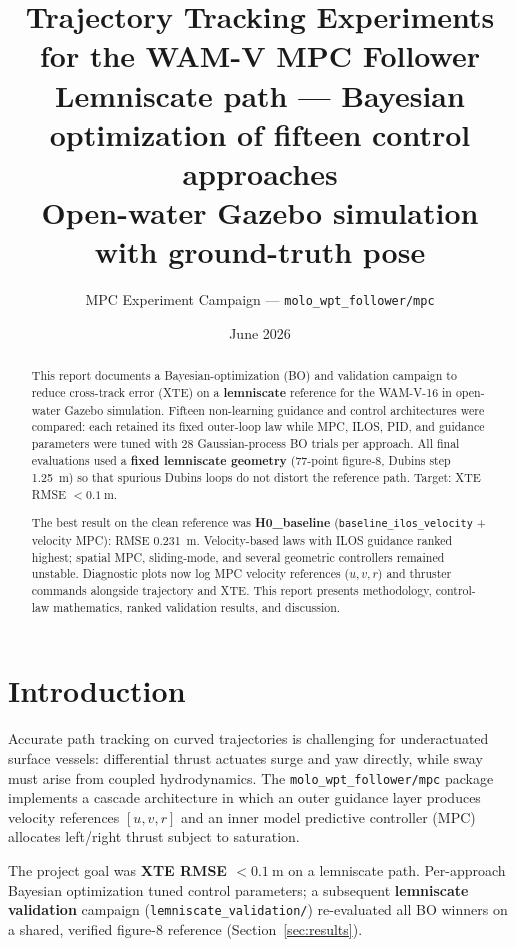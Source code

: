\documentclass[11pt,a4paper]{article}
\title{%
  \textbf{Trajectory Tracking Experiments for the WAM-V MPC Follower}\\[0.4em]
  \large Lemniscate path --- Bayesian optimization of fifteen control approaches\\
  \normalsize Open-water Gazebo simulation with ground-truth pose
}
\author{MPC Experiment Campaign --- \texttt{molo\_wpt\_follower/mpc}}
\date{June 2026}
\begin{document}
\maketitle

\begin{abstract}
This report documents a Bayesian-optimization (BO) and validation campaign to reduce
cross-track error (XTE) on a \textbf{lemniscate} reference for the WAM-V-16 in open-water
Gazebo simulation. Fifteen non-learning guidance and control architectures were compared:
each retained its fixed outer-loop law while MPC, ILOS, PID, and guidance parameters were
tuned with 28 Gaussian-process BO trials per approach. All final evaluations used a
\textbf{fixed lemniscate geometry} (77-point figure-8, Dubins step \SI{1.25}{\meter}) so that
spurious Dubins loops do not distort the reference path. Target: XTE RMSE $< \SI{0.1}{\meter}$.

The best result on the clean reference was \textbf{H0\_baseline}
(\texttt{baseline\_ilos\_velocity} + velocity MPC): RMSE \SI{0.231}{\meter}.
Velocity-based laws with ILOS guidance ranked highest; spatial MPC, sliding-mode, and
several geometric controllers remained unstable. Diagnostic plots now log MPC velocity
references ($u,v,r$) and thruster commands alongside trajectory and XTE.
This report presents methodology, control-law mathematics, ranked validation results, and discussion.
\end{abstract}

\tableofcontents
\newpage

\section{Introduction}
\label{sec:intro}

Accurate path tracking on curved trajectories is challenging for underactuated surface
vessels: differential thrust actuates surge and yaw directly, while sway must arise from
coupled hydrodynamics. The \texttt{molo\_wpt\_follower/mpc} package implements a cascade
architecture in which an outer guidance layer produces velocity references
$[u, v, r]$ and an inner model predictive controller (MPC) allocates left/right thrust
subject to saturation.

The project goal was \textbf{XTE RMSE $< \SI{0.1}{\meter}$} on a lemniscate path. Per-approach
Bayesian optimization tuned control parameters; a subsequent \textbf{lemniscate validation}
campaign (\texttt{lemniscate\_validation/}) re-evaluated all BO winners on a shared,
verified figure-8 reference (Section~\ref{sec:results}).
\end{document}
